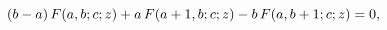 \[(b-a)\mathop{F\/}\nolimits\!\left(a,b;c;z\right)+a\mathop{F\/}\nolimits\!\left%
(a+1,b;c;z\right)-b\mathop{F\/}\nolimits\!\left(a,b+1;c;z\right)=0,\]